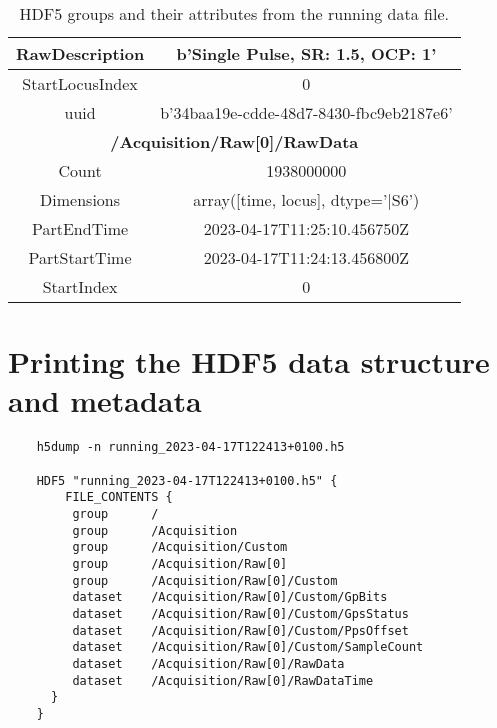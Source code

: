 \begin{table}[]
\begin{tabular}{|c|c|}
		RawDescription & b'Single Pulse, SR: 1.5, OCP: 1' \\ \hline
		StartLocusIndex & 0 \\ \hline
		uuid & b'34baa19e-cdde-48d7-8430-fbc9eb2187e6' \\ \hline
    \multicolumn{2}{|c|}{\textbf{/Acquisition/Raw[0]/RawData}} \\ \hline
		Count & 1938000000  \\ \hline
		Dimensions & array([time, locus], dtype='|S6')  \\ \hline
		PartEndTime & 2023-04-17T11:25:10.456750Z  \\ \hline
		PartStartTime & 2023-04-17T11:24:13.456800Z  \\ \hline
		StartIndex & 0  \\ \hline
    \hline
    \end{tabular}
    \caption{HDF5 groups and their attributes from the running data file.}
    \label{tab:filerunning}
\end{table}

\chapter{Printing the HDF5 data structure and metadata}

\begin{verbatim}
    h5dump -n running_2023-04-17T122413+0100.h5

    HDF5 "running_2023-04-17T122413+0100.h5" {
        FILE_CONTENTS {
         group      /
         group      /Acquisition
         group      /Acquisition/Custom
         group      /Acquisition/Raw[0]
         group      /Acquisition/Raw[0]/Custom
         dataset    /Acquisition/Raw[0]/Custom/GpBits
         dataset    /Acquisition/Raw[0]/Custom/GpsStatus
         dataset    /Acquisition/Raw[0]/Custom/PpsOffset
         dataset    /Acquisition/Raw[0]/Custom/SampleCount
         dataset    /Acquisition/Raw[0]/RawData
         dataset    /Acquisition/Raw[0]/RawDataTime
      }
    }


    
\end{verbatim}







